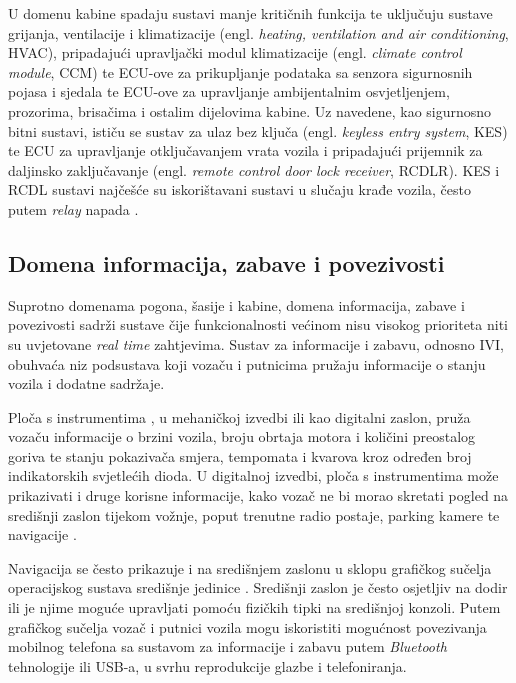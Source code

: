 \documentclass[times, utf8, diplomski, numeric]{fer}
\begin{document}
U domenu kabine spadaju sustavi manje kritičnih funkcija te uključuju sustave grijanja, ventilacije i klimatizacije (engl. \textit{heating, ventilation and air conditioning}, HVAC), pripadajući upravljački modul klimatizacije (engl. \textit{climate control module}, CCM) te ECU-ove za prikupljanje podataka sa senzora sigurnosnih pojasa i sjedala te ECU-ove za upravljanje ambijentalnim osvjetljenjem, prozorima, brisačima i ostalim dijelovima kabine. Uz navedene, kao sigurnosno bitni sustavi, ističu se sustav za ulaz bez ključa (engl. \textit{keyless entry system}, KES) te ECU za upravljanje otključavanjem vrata vozila i pripadajući prijemnik za daljinsko zaključavanje (engl. \textit{remote control door lock receiver}, RCDLR). KES i RCDL sustavi najčešće su iskorištavani sustavi u slučaju krađe vozila, često putem \textit{relay} napada \cite{nasser2023automotive, cbc2020relay}.

\subsection{Domena informacija, zabave i povezivosti}
Suprotno domenama pogona, šasije i kabine, domena informacija, zabave i povezivosti sadrži sustave čije funkcionalnosti većinom nisu visokog prioriteta niti su uvjetovane \textit{real time} zahtjevima. Sustav za informacije i zabavu, odnosno IVI, obuhvaća niz podsustava koji vozaču i putnicima pružaju informacije o stanju vozila i dodatne sadržaje. 

Ploča s instrumentima , u mehaničkoj izvedbi ili kao digitalni zaslon, pruža vozaču informacije o brzini vozila, broju obrtaja motora i količini preostalog goriva te stanju pokazivača smjera, tempomata i kvarova kroz određen broj indikatorskih svjetlećih dioda. U digitalnoj izvedbi, ploča s instrumentima može prikazivati i druge korisne informacije, kako vozač ne bi morao skretati pogled na središnji zaslon tijekom vožnje, poput trenutne radio postaje, parking kamere te navigacije \cite{bosch2022handbook, nasser2023automotive}. 

Navigacija se često prikazuje i na središnjem zaslonu u sklopu grafičkog sučelja operacijskog sustava središnje jedinice . Središnji zaslon je često osjetljiv na dodir ili je njime moguće upravljati pomoću fizičkih tipki na središnjoj konzoli. Putem grafičkog sučelja vozač i putnici vozila mogu iskoristiti mogućnost povezivanja mobilnog telefona sa sustavom za informacije i zabavu putem \textit{Bluetooth} tehnologije ili USB-a, u svrhu reprodukcije glazbe i telefoniranja.
\end{document}
